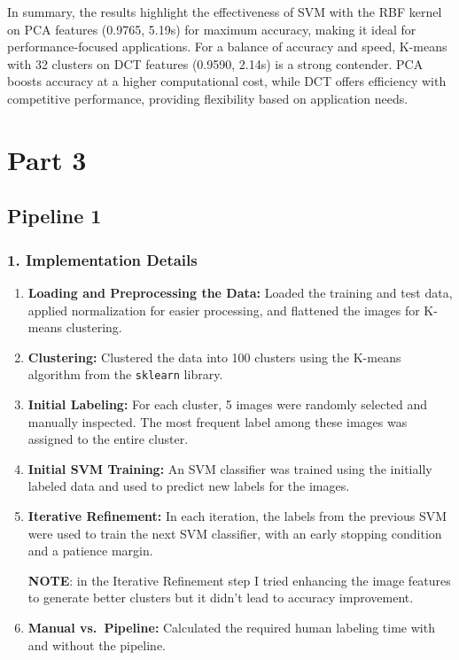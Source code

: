 \documentclass[12pt]{article}
\begin{document}
In summary, the results highlight the effectiveness of SVM with the RBF kernel on PCA features (0.9765, 5.19s) for maximum accuracy, making it ideal for performance-focused applications. For a balance of accuracy and speed, K-means with 32 clusters on DCT features (0.9590, 2.14s) is a strong contender. PCA boosts accuracy at a higher computational cost, while DCT offers efficiency with competitive performance, providing flexibility based on application needs.

\newpage
\section*{Part 3}
\subsection*{Pipeline 1}

\subsubsection*{1. Implementation Details}
\begin{enumerate}
    \item \textbf{Loading and Preprocessing the Data:} Loaded the training and test data, applied normalization for easier processing, and flattened the images for K-means clustering.
    \item \textbf{Clustering:} Clustered the data into 100 clusters using the K-means algorithm from the \texttt{sklearn} library.
    \item \textbf{Initial Labeling:} For each cluster, 5 images were randomly selected and manually inspected. The most frequent label among these images was assigned to the entire cluster.
    \item \textbf{Initial SVM Training:} An SVM classifier was trained using the initially labeled data and used to predict new labels for the images. 

    \item \textbf{Iterative Refinement:} In each iteration, the labels from the previous SVM were used to train the next SVM classifier, with an early stopping condition and a patience margin.
    
    \textbf{NOTE}: in the Iterative Refinement step I tried enhancing the image features to generate better clusters but it didn't lead to accuracy improvement.
    \item \textbf{Manual vs.\ Pipeline:} Calculated the required human labeling time with and without the pipeline.
    
\end{enumerate}
\end{document}

